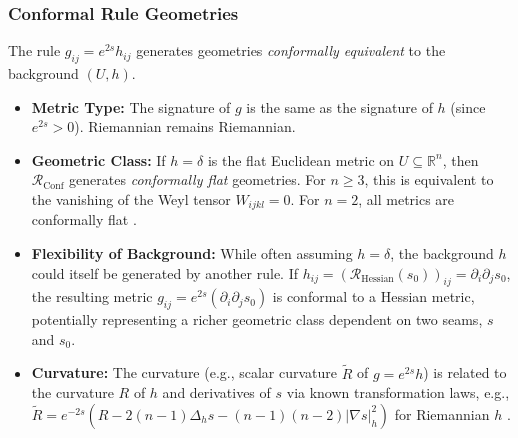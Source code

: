 \documentclass[twoside,twocolumn]{article}
\numberwithin{equation}{section} %
\begin{document}
\subsubsection{Conformal Rule Geometries}
The rule \( g_{ij} = e^{2s} h_{ij} \) generates geometries \emph{conformally equivalent} to the background \( (U, h) \).
\begin{itemize}
    \item \textbf{Metric Type:} The signature of \( g \) is the same as the signature of \( h \) (since \( e^{2s}>0 \)). Riemannian remains Riemannian.
    \item \textbf{Geometric Class:} If \( h = \delta \) is the flat Euclidean metric on \( U \subseteq \mathbb{R}^n \), then \( \mathcal{R}_{\text{Conf}} \) generates \emph{conformally flat} geometries. For \( n \ge 3 \), this is equivalent to the vanishing of the Weyl tensor \( W_{ijkl}=0 \). For \( n=2 \), all metrics are conformally flat \cite{DiFrancesco2012}. %
    \item \textbf{Flexibility of Background:} While often assuming \( h=\delta \), the background \( h \) could itself be generated by another rule. If \( h_{ij} = (\mathcal{R}_{\text{Hessian}}(s_0))_{ij} = \partial_i \partial_j s_0 \), the resulting metric \( g_{ij} = e^{2s} (\partial_i \partial_j s_0) \) is conformal to a Hessian metric, potentially representing a richer geometric class dependent on two seams, \( s \) and \( s_0 \).
    \item \textbf{Curvature:} The curvature (e.g., scalar curvature \( \tilde{R} \) of \( g=e^{2s}h \)) is related to the curvature \( R \) of \( h \) and derivatives of \( s \) via known transformation laws, e.g., \( \tilde{R} = e^{-2s}(R - 2(n-1)\Delta_h s - (n-1)(n-2)|\nabla s|_h^2) \) for Riemannian \( h \) \cite{Besse1987}. %
\end{itemize}
\end{document}
